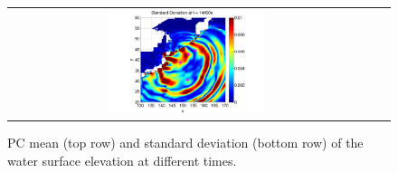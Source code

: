 \begin{figure}[h]
\begin{tabular}{ccc}
\hspace*{-65pt}
\includegraphics[width=0.45\textwidth]{./figures/sigma2d4.pdf}
\end{tabular}
\caption{PC mean (top row) and standard deviation (bottom row) of the water surface elevation at different times.}
\label{fig:mean2d}
\end{figure}

